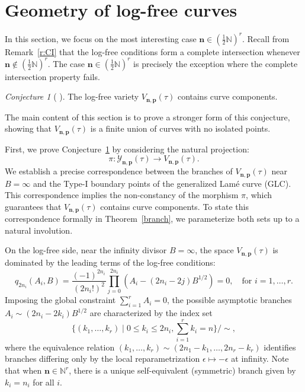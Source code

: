 \documentclass[11pt]{amsart}
\theoremstyle{remark}
\newtheorem{conjecture}[theorem]{Conjecture}
\numberwithin{equation}{section}
\begin{document}
\section{Geometry of log-free curves}
In this section, we focus on the most interesting case $\mathbf{n} \in (\tfrac{1}{2} \mathbb{N})^r$. 
Recall from Remark~\ref{r:CI} that the log-free conditions form a complete intersection whenever $\mathbf{n} \notin (\tfrac{1}{2}\mathbb{N})^r$. The case $\mathbf{n} \in (\tfrac{1}{2} \mathbb{N})^r$ is precisely the exception where the complete intersection property fails.

\begin{conjecture}[{ \cite[Conjecture~5.7]{Wang_2020} }] \label{conj_Wang}
The log-free variety $V_{\mathbf{n},\mathbf{p}}(\tau)$ contains curve components. 
\end{conjecture}


The main content of this section is to prove a stronger form of this conjecture, showing that $V_{\mathbf{n},\mathbf{p}}(\tau)$ is a finite union of curves with no isolated points.

First, we prove Conjecture~\ref{conj_Wang} by considering the natural projection:
\[
    \pi: \mathcal{Y}_{\mathbf{n},\mathbf{p}}(\tau) \rightarrow V_{\mathbf{n},\mathbf{p}}(\tau).
\]
We establish a precise correspondence between the branches of $V_{\mathbf{n},\mathbf{p}}(\tau)$ near $B=\infty$ and the Type-I boundary points of the generalized Lam\'e curve (GLC). This correspondence implies the non-constancy of the morphism $\pi$, which guarantees that $V_{\mathbf{n},\mathbf{p}}(\tau)$ contains curve components. To state this correspondence formally in Theorem~\ref{branch}, we parameterize both sets up to a natural involution.

On the log-free side, near the infinity divisor $B=\infty$, the space $V_{\mathbf{n},\mathbf{p}}(\tau)$ is dominated by the leading terms of the log-free conditions:
\[
    q_{2n_i}(A_i, B) = \frac{(-1)^{2n_i}}{({2n_i} !)^2}\prod_{j = 0}^{2n_i} (A_i - ({2n_i} - 2j)B^{1/2})=0, \quad \text{for } i=1,\dots,r.
\]
Imposing the global constraint $\sum_{i=1}^r A_i = 0$, the possible asymptotic branches $A_i \sim (2n_i-2k_i)B^{1/2}$ are characterized by the index set
\[
    \Big\{ (k_1, \dots, k_r) \mid 0 \leq k_i \leq 2n_i, \sum_{i=1}^r k_i = n \Big\} / \sim,
\]
where the equivalence relation $(k_1,\dots,k_r) \sim (2n_1-k_1,\dots,2n_r-k_r)$ identifies branches differing only by the local reparametrization $\epsilon \mapsto -\epsilon$ at infinity. Note that when $\mathbf{n} \in \mathbb{N}^r$, there is a unique self-equivalent (symmetric) branch given by $k_i = n_i$ for all $i$.
\end{document}
